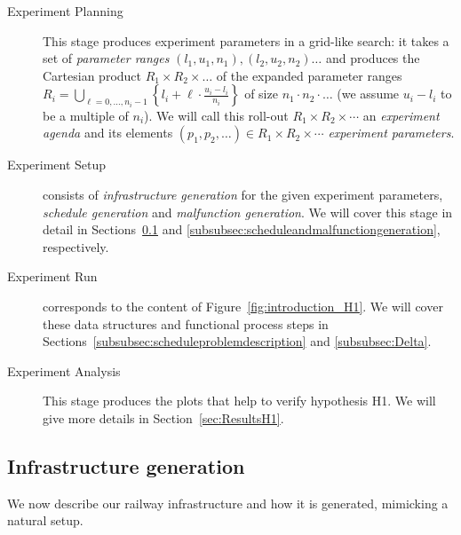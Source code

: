 \documentclass{article}
\begin{document}
\begin{description}
\item[Experiment Planning] This stage produces experiment parameters in a grid-like search: it takes a set of \emph{parameter ranges} $(l_1,u_1,n_1),(l_2,u_2,n_2)\ldots$ and produces the Cartesian product $R_1 \times R_2 \times \ldots$ of the expanded parameter ranges $R_i=\bigcup_{\ell=0,\ldots,n_i-1} \left\{ l_i + \ell \cdot \frac{u_i-l_i}{n_i}\right\}$ of size $n_1 \cdot n_2 \cdot \ldots$ (we assume $u_i-l_i$ to be a multiple of $n_i$). We will call this roll-out $R_1\times R_2 \times \cdots$ an \emph{experiment agenda} and its elements $(p_1,p_2,\ldots)\in R_1\times R_2 \times\cdots$ \emph{experiment parameters}.
\item[Experiment Setup] consists of \emph{infrastructure generation} for the given experiment parameters, \emph{schedule generation} and \emph{malfunction generation}. We will cover this stage in detail in Sections~\ref{subsubsec:infrastructuregeneration} and \ref{subsubsec:scheduleandmalfunctiongeneration}, respectively.
\item[Experiment Run] corresponds to the content of Figure~\ref{fig:introduction_H1}. We will cover these data structures and functional process steps in Sections~\ref{subsubsec:scheduleproblemdescription} and \ref{subsubsec:Delta}.
\item[Experiment Analysis] This stage produces the plots that help to verify hypothesis H1. We will give more details in Section~\ref{sec:ResultsH1}.
\end{description}



\subsection{Infrastructure generation}\label{subsubsec:infrastructuregeneration}

We now describe our railway infrastructure and how it is generated, mimicking a natural setup.
\end{document}
